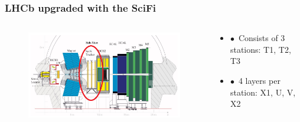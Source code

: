\documentclass[aspectratio=1610, 12pt]{beamer}
\begin{document}
\begin{frame}\frametitle{LHCb upgraded with the SciFi}
  \begin{columns}
    \begin{column}[c]{0.6\textwidth}
      \begin{figure}
        \includegraphics[width=\textwidth]{logos/upgrade_lhcb.png}
      \end{figure}
    \end{column}
    \begin{column}{0.38\textwidth}
      \begin{itemize}
        \item $\bullet$\, Consists of 3 stations: T1, T2, T3
        \item $\bullet$\, 4 layers per station: X1, U, V, X2
      \end{itemize}
    \end{column}
  \end{columns}
\end{frame}
\end{document}
